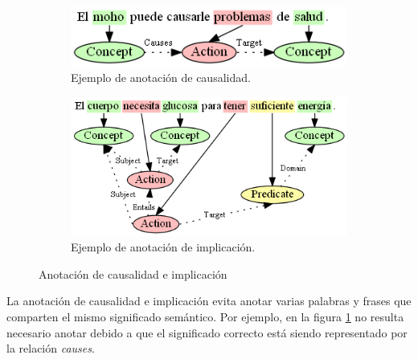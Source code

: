 \vspace{-0.05in}
\begin{center}
\end{center}

\vspace{-0.05in}
\begin{figure}[H]
	\centering
	\begin{subfigure}{3.25in}
		\includegraphics[width=\textwidth]{graphics/annotation_example_causes.png}
		\caption{Ejemplo de anotación de causalidad.}
		\vspace{0.4in}
		\label{fig:annotation_example_causes}
	\end{subfigure}
	\begin{subfigure}{3.9in}
		\includegraphics[width=\linewidth]{graphics/annotation_example_entails.png}
		\caption{Ejemplo de anotación de implicación.}
		\label{fig:annotation_example_entails}
	\end{subfigure}
	\caption{Anotación de causalidad e implicación}
\end{figure}

\vspace{-0.1in}
La anotación de causalidad e implicación evita anotar varias palabras y frases que comparten el mismo significado semántico. Por ejemplo, en la figura \ref{fig:annotation_example_causes} no resulta necesario anotar  debido a que el significado correcto está siendo representado por la relación \textit{causes}.

